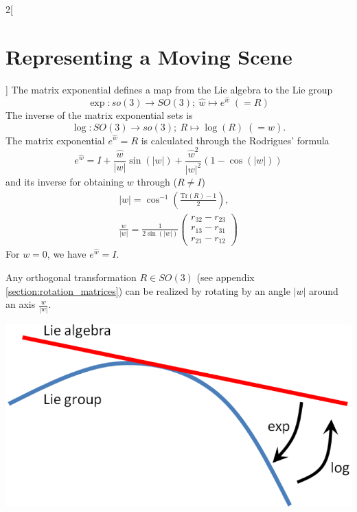 \documentclass[oneside,fontsize=11pt,paper=a4]{scrartcl}
\newenvironment{myfigure}
  {\par\medskip\noindent\minipage{\linewidth}}
  {\endminipage\par\medskip}
\begin{document}
\begin{multicols}{2}[\section{Representing a Moving Scene}]
The matrix exponential defines a map from the Lie algebra to the Lie group
\begin{equation*}
    \exp: so(3) \rightarrow SO(3); \ \hat{w} \mapsto e^{\hat{w}} \; (= R)
\end{equation*}
The inverse of the matrix exponential sets is
\begin{equation*}
    \log: SO(3) \rightarrow so(3); \ R \mapsto \log(R) \; (= \hat{w}).
\end{equation*}
The matrix exponential $e^{\hat{w}} = R$ is calculated through the Rodrigues' formula
\begin{equation*}
    e^{\hat{w}} = I + \frac{\hat{w}}{|w|} \sin(|w|) + \frac{\hat{w}^2}{|w|^2} \left(1-\cos\left(|w|\right)\right)
\end{equation*}
and its inverse for obtaining $w$ through ($R \neq I$)
\begin{equation*}
\begin{split}
   |w| = \cos^{-1} \left(\frac{\text{Tr}(R)-1}{2} \right), \\ \frac{w}{|w|} = \frac{1}{2\sin\left(|w|\right)} \begin{pmatrix}r_{32} - r_{23}\\ r_{13} - r_{31}\\ r_{21} - r_{12} \end{pmatrix}
\end{split}
\end{equation*}
For $w = 0$, we have $e^{\hat{w}} = I$.

Any orthogonal transformation $R \in SO(3)$ (see appendix \ref{section:rotation_matrices}) can be realized by rotating by an angle $|w|$ around
an axis $\frac{w}{|w|}$.

\begin{myfigure}
	\centering
	\includegraphics[width=0.6\linewidth]{Images/lie_group_algebra.PNG}
\end{myfigure}


\end{multicols}
\end{document}
